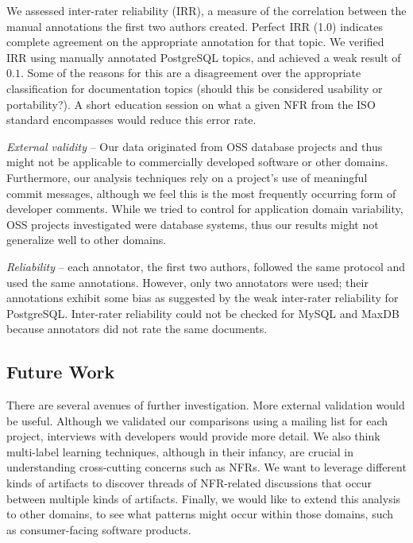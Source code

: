 \documentclass[smallextended]{svjour3}       %
\begin{document}
We assessed inter-rater reliability (IRR), a measure of the correlation between the manual annotations the first two authors created. Perfect IRR (1.0) indicates complete agreement 
on the appropriate annotation for that topic. We verified IRR using
manually annotated PostgreSQL topics, and achieved a weak result of $0.1$.
Some of the reasons for this are a disagreement over the appropriate classification for documentation topics (should this be considered
usability or portability?). A short education session on what a given NFR from the ISO standard encompasses would reduce this error rate.

\emph{External validity} -- %
Our data originated from OSS database projects and thus might not be applicable to commercially developed software or other domains. 
Furthermore, our analysis techniques rely on a project's use of meaningful commit messages, although we feel this is the most frequently occurring form
of developer comments. 
While we tried to control for application domain variability, OSS
projects investigated were database systems, thus our results might
not generalize well to other domains.


\emph{Reliability} -- each annotator, the first two authors, followed the same protocol and used the same annotations. 
However, only two annotators were used; their annotations exhibit some
bias as suggested by the weak inter-rater reliability for
PostgreSQL. Inter-rater reliability could not be checked for MySQL and
MaxDB because annotators did not rate the same documents.

\subsection{Future Work}
There are several avenues of further investigation.  
More external validation would be useful. 
Although we validated our comparisons using a mailing list for each project, interviews with developers would provide more detail. 
We also think multi-label learning techniques, although in their infancy, are crucial in understanding cross-cutting concerns such as NFRs. 
We want to leverage different kinds of artifacts to discover threads of NFR-related discussions that occur between multiple kinds of artifacts.
Finally, we would like to extend this analysis to other domains, to
see what patterns might occur within those domains, such as consumer-facing software products.
\end{document}
